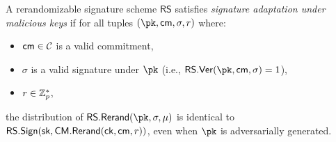 \begin{definition}
A rerandomizable signature scheme $\mathsf{RS}$ satisfies \emph{signature adaptation under malicious keys} if for all tuples $(\pk, \cm, \sigma, r)$ where:
\begin{itemize}
    \item $\mathsf{cm} \in \mathcal{C}$ is a valid commitment,
    \item $\sigma$ is a valid signature under $\pk$ (i.e., $\mathsf{RS.Ver}(\pk, \cm, \sigma) = 1$),
    \item $r \in \mathbb{Z}_p^*$,
\end{itemize}
the distribution of $\mathsf{RS.Rerand}(\pk, \sigma, \mu)$ is identical to $\mathsf{RS.Sign}(\mathsf{sk}, \mathsf{CM.Rerand}(\mathsf{ck}, \mathsf{cm}, r))$, even when $\pk$ is adversarially generated.
\end{definition}




